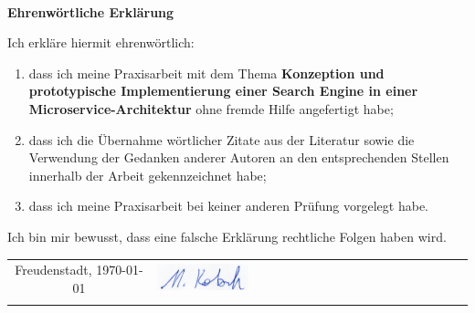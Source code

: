 
~

\vspace{17.1mm}

\begin{flushleft}
    \textbf{\huge{}Ehrenwörtliche Erklärung}{\huge\par}
\par\end{flushleft}

Ich erkläre hiermit ehrenwörtlich:

\begin{enumerate}
    \item dass ich meine Praxisarbeit mit dem Thema \textbf{\glqq Konzeption und prototypische Implementierung einer Search Engine in einer Microservice-Architektur\grqq{}} ohne fremde Hilfe angefertigt habe;
    \item dass ich die Übernahme wörtlicher Zitate aus der Literatur sowie die Verwendung der Gedanken anderer Autoren an den entsprechenden Stellen innerhalb der Arbeit gekennzeichnet habe;
    \item dass ich meine Praxisarbeit bei keiner anderen Prüfung vorgelegt habe.
\end{enumerate}

Ich bin mir bewusst, dass eine falsche Erklärung rechtliche Folgen haben wird.

\vspace{2cm}

\begin{center}
    \begin{tabular*}{\textwidth}{@{\extracolsep{\fill}}cl}
        Freudenstadt, \today & \includegraphics[width=0.3\textwidth]{images/Unterschrift.png}
        \tabularnewline
        & \author{}
        \tabularnewline
    \end{tabular*}
    \par
\end{center}